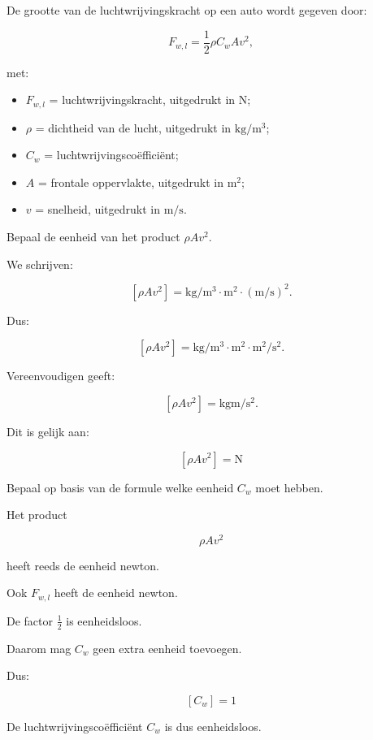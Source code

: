 \documentclass{ximera}
\begin{document}
\begin{oefening}[De luchtwrijvingscoëfficiënt]{\oefU}

De grootte van de luchtwrijvingskracht op een auto wordt gegeven door:

\[
F_{w,l}
=
\frac{1}{2}
\rho C_w A v^2,
\]

met:

\begin{itemize}
    \item $F_{w,l}$ = luchtwrijvingskracht, uitgedrukt in $\si{\newton}$;
    \item $\rho$ = dichtheid van de lucht, uitgedrukt in
          $\si{\kilogram\per\meter\cubed}$;
    \item $C_w$ = luchtwrijvingscoëfficiënt;
    \item $A$ = frontale oppervlakte, uitgedrukt in $\si{\meter\squared}$;
    \item $v$ = snelheid, uitgedrukt in $\si{\meter\per\second}$.
\end{itemize}

\begin{question}
Bepaal de eenheid van het product $\rho A v^2$.

\begin{oplossing}
We schrijven:

\[
[\rho A v^2]
=
\si{\kilogram\per\meter\cubed}
\cdot
\si{\meter\squared}
\cdot
\left(
\si{\meter\per\second}
\right)^2.
\]

Dus:

\[
[\rho A v^2]
=
\si{\kilogram\per\meter\cubed}
\cdot
\si{\meter\squared}
\cdot
\si{\meter\squared\per\second\squared}.
\]

Vereenvoudigen geeft:

\[
[\rho A v^2]
=
\si{\kilogram\meter\per\second\squared}.
\]

Dit is gelijk aan:

\[
\boxed{
[\rho A v^2] = \si{\newton}
}
\]
\end{oplossing}
\end{question}


\begin{question}
Bepaal op basis van de formule welke eenheid $C_w$ moet hebben.

\begin{oplossing}
Het product

\[
\rho A v^2
\]

heeft reeds de eenheid newton.

Ook $F_{w,l}$ heeft de eenheid newton.

De factor $\frac{1}{2}$ is eenheidsloos.

Daarom mag $C_w$ geen extra eenheid toevoegen.

Dus:

\[
\boxed{
[C_w] = 1
}
\]

De luchtwrijvingscoëfficiënt $C_w$ is dus eenheidsloos.
\end{oplossing}
\end{question}

\end{oefening}
\end{document}
